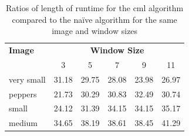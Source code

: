 \begin{table}
\centering
\caption[Ratios of runtime for the  algorithm compared to the naïve algorithm]{Ratios of length of runtime for the \gls{cml} algorithm compared to the naïve algorithm for the same image and window sizes}
\label{tab:median:ratcml}
\begin{tabular}{@{}lccccc@{}}
\toprule
\textbf{Image} & \multicolumn{5}{c}{\textbf{Window Size}} \\
               & 3      & 5      & 7      & 9     & 11    \\ \midrule
very small     & 31.18  & 29.75  & 28.08  & 23.98 & 26.97 \\
peppers        & 21.73  & 30.29  & 30.83  & 32.49 & 30.74 \\
small          & 24.12  & 31.39  & 34.15  & 34.15 & 35.17 \\
medium         & 34.65  & 38.19  & 38.61  & 38.45 & 41.29 \\ \bottomrule
\end{tabular}
\end{table}

